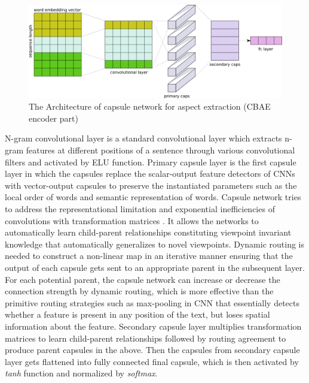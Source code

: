 \documentclass{article}
\begin{document}
\begin{figure}[!tbh]
    \centering
    \includegraphics[width=1\linewidth]{rect10315.png}
    \caption{The Architecture of capsule network for aspect extraction (CBAE encoder part)}
    \label{fig:capsule}
\end{figure}

N-gram convolutional layer is a standard convolutional layer which extracts n-gram features at different positions of a sentence through various convolutional filters\cite{Zhao2018} and activated by ELU function. Primary capsule layer is the first capsule layer in which the capsules replace the scalar-output feature detectors of CNNs with vector-output capsules to preserve the instantiated parameters such as the local order of words and semantic representation of words. Capsule network tries to address the representational limitation and exponential inefficiencies of convolutions with transformation matrices \cite{Hinton2017DRBC}. It allows the networks to automatically learn child-parent relationships constituting viewpoint invariant knowledge that automatically generalizes to novel viewpoints. Dynamic routing is needed to construct a non-linear map in an iterative manner ensuring that the output of each capsule gets sent to an appropriate parent in the subsequent layer. For each potential parent, the capsule network can increase or decrease the connection strength by dynamic routing, which is more effective than the primitive routing strategies such as max-pooling in CNN that essentially detects whether a feature is present in any position of the text, but loses spatial information about the feature. Secondary capsule layer multiplies transformation matrices to learn child-parent relationships followed by routing agreement to produce parent capsules in the above. Then the capsules from secondary capsule layer gets flattened into fully connected final capsule, which is then activated by \textit{tanh} function and normalized by \textit{softmax}.
\end{document}
